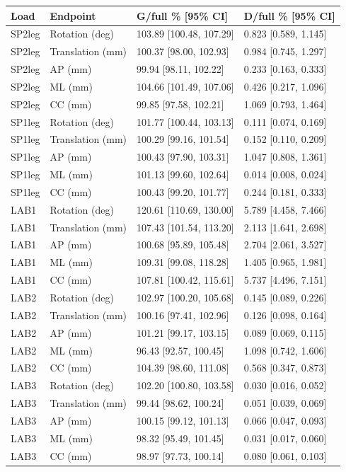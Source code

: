 \begin{tabular}{llll}
\toprule
Load & Endpoint & G/full \% [95\% CI] & D/full \% [95\% CI] \\
\midrule
SP2leg & Rotation (deg) & 103.89 [100.48, 107.29] & 0.823 [0.589, 1.145] \\
SP2leg & Translation (mm) & 100.37 [98.00, 102.93] & 0.984 [0.745, 1.297] \\
SP2leg & AP (mm) & 99.94 [98.11, 102.22] & 0.233 [0.163, 0.333] \\
SP2leg & ML (mm) & 104.66 [101.49, 107.06] & 0.426 [0.217, 1.096] \\
SP2leg & CC (mm) & 99.85 [97.58, 102.21] & 1.069 [0.793, 1.464] \\
SP1leg & Rotation (deg) & 101.77 [100.44, 103.13] & 0.111 [0.074, 0.169] \\
SP1leg & Translation (mm) & 100.29 [99.16, 101.54] & 0.152 [0.110, 0.209] \\
SP1leg & AP (mm) & 100.43 [97.90, 103.31] & 1.047 [0.808, 1.361] \\
SP1leg & ML (mm) & 101.13 [99.60, 102.64] & 0.014 [0.008, 0.024] \\
SP1leg & CC (mm) & 100.43 [99.20, 101.77] & 0.244 [0.181, 0.333] \\
LAB1 & Rotation (deg) & 120.61 [110.69, 130.00] & 5.789 [4.458, 7.466] \\
LAB1 & Translation (mm) & 107.43 [101.54, 113.20] & 2.113 [1.641, 2.698] \\
LAB1 & AP (mm) & 100.68 [95.89, 105.48] & 2.704 [2.061, 3.527] \\
LAB1 & ML (mm) & 109.31 [99.08, 118.28] & 1.405 [0.965, 1.981] \\
LAB1 & CC (mm) & 107.81 [100.42, 115.61] & 5.737 [4.496, 7.151] \\
LAB2 & Rotation (deg) & 102.97 [100.20, 105.68] & 0.145 [0.089, 0.226] \\
LAB2 & Translation (mm) & 100.16 [97.41, 102.96] & 0.126 [0.098, 0.164] \\
LAB2 & AP (mm) & 101.21 [99.17, 103.15] & 0.089 [0.069, 0.115] \\
LAB2 & ML (mm) & 96.43 [92.57, 100.45] & 1.098 [0.742, 1.606] \\
LAB2 & CC (mm) & 104.39 [98.60, 111.08] & 0.568 [0.347, 0.873] \\
LAB3 & Rotation (deg) & 102.20 [100.80, 103.58] & 0.030 [0.016, 0.052] \\
LAB3 & Translation (mm) & 99.44 [98.62, 100.24] & 0.051 [0.039, 0.069] \\
LAB3 & AP (mm) & 100.15 [99.12, 101.13] & 0.066 [0.047, 0.093] \\
LAB3 & ML (mm) & 98.32 [95.49, 101.45] & 0.031 [0.017, 0.060] \\
LAB3 & CC (mm) & 98.97 [97.73, 100.14] & 0.080 [0.061, 0.103] \\
\bottomrule
\end{tabular}
